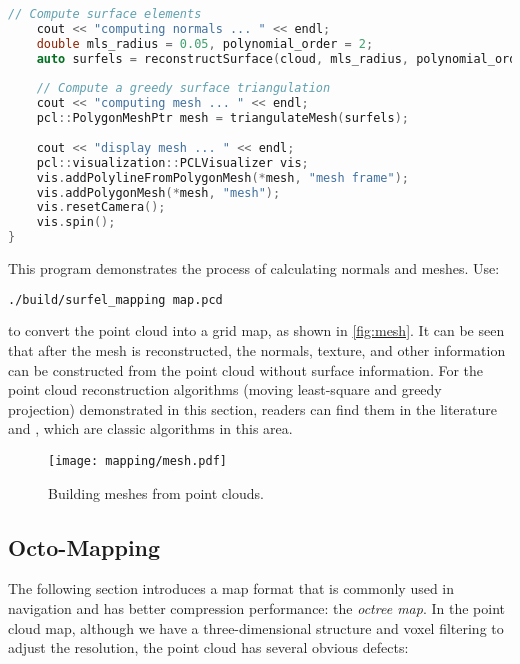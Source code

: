 \begin{lstlisting}[language=c++,caption=slambook2/ch12/dense_RGBD/surfel_mapping.cpp]
	// Compute surface elements
	cout << "computing normals ... " << endl;
	double mls_radius = 0.05, polynomial_order = 2;
	auto surfels = reconstructSurface(cloud, mls_radius, polynomial_order);
	
	// Compute a greedy surface triangulation
	cout << "computing mesh ... " << endl;
	pcl::PolygonMeshPtr mesh = triangulateMesh(surfels);
	
	cout << "display mesh ... " << endl;
	pcl::visualization::PCLVisualizer vis;
	vis.addPolylineFromPolygonMesh(*mesh, "mesh frame");
	vis.addPolygonMesh(*mesh, "mesh");
	vis.resetCamera();
	vis.spin();
}
\end{lstlisting}

This program demonstrates the process of calculating normals and meshes. Use:
\begin{lstlisting}[language=sh,caption=Terminal input:]
./build/surfel_mapping map.pcd
\end{lstlisting}
to convert the point cloud into a grid map, as shown in \autoref{fig:mesh}. It can be seen that after the mesh is reconstructed, the normals, texture, and other information can be constructed from the point cloud without surface information. For the point cloud reconstruction algorithms (moving least-square and greedy projection) demonstrated in this section, readers can find them in the literature \cite{Alexa2003} and \cite{Marton2009}, which are classic algorithms in this area.

\begin{figure}[!htp]
	\centering
	\texttt{[image: mapping/mesh.pdf]}
	\caption{Building meshes from point clouds.}
	\label{fig:mesh}
\end{figure}

\subsection{Octo-Mapping}
The following section introduces a map format that is commonly used in navigation and has better compression performance: the \textit{octree map}. In the point cloud map, although we have a three-dimensional structure and voxel filtering to adjust the resolution, the point cloud has several obvious defects:

